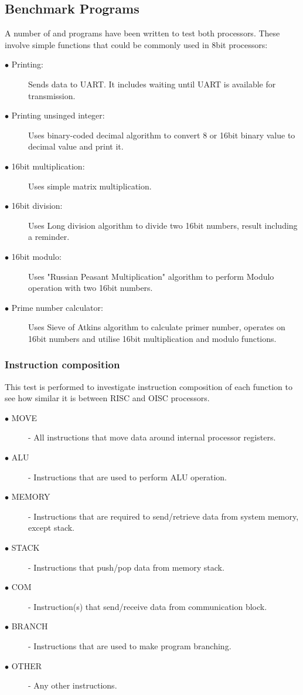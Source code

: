 \subsection{Benchmark Programs}
A number of and programs have been written to test both processors. These involve simple functions that could be commonly used in 8bit processors:

\begin{description}
	\item[$\bullet$ Printing:] Sends data to UART. It includes waiting until UART is available for transmission. 
	\item[$\bullet$ Printing unsinged integer:] Uses binary-coded decimal algorithm to convert 8 or 16bit binary value to decimal value and print it. 
	\item[$\bullet$ 16bit multiplication:] Uses simple matrix multiplication. 
	\item[$\bullet$ 16bit division:] Uses Long division algorithm to divide two 16bit numbers, result including a reminder.
	\item[$\bullet$ 16bit modulo:] Uses "Russian Peasant Multiplication" algorithm to perform Modulo operation with two 16bit numbers.
	\item[$\bullet$ Prime number calculator:] Uses Sieve of Atkins algorithm to calculate primer number, operates on 16bit numbers and utilise 16bit multiplication and modulo functions. 
\end{description}


\subsubsection{Instruction composition}\label{subsec:instr_comp}

This test is performed to investigate instruction composition of each function to see how similar it is between RISC and OISC processors. 
\begin{description}
	\item[$\bullet$ MOVE] - All instructions that move data around internal processor registers.
	\item[$\bullet$ ALU] - Instructions that are used to perform ALU operation.
	\item[$\bullet$ MEMORY] - Instructions that are required to send/retrieve data from system memory, except stack.
	\item[$\bullet$ STACK] - Instructions that push/pop data from memory stack.
	\item[$\bullet$ COM] - Instruction(s) that send/receive data from communication block.
	\item[$\bullet$ BRANCH] - Instructions that are used to make program branching.
	\item[$\bullet$ OTHER] - Any other instructions.
\end{description}

